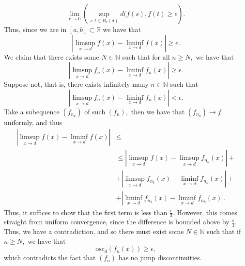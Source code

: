 \documentclass[11pt]{article}
\newcommand{\bbN}{\mathbb{N}}
\newcommand{\bbR}{\mathbb{R}}
\begin{document}
\begin{enumerate}
\begin{solution}
        \[\lim_{r\to 0}\left(\sup_{s,t\in B_r(d)}d(f(s), f(t) \geq \epsilon\right).\] Thus, since we are in $[a,b]\subset \bbR$ we have that 
        \[|\limsup_{x\to d}f(x) - \liminf_{x\to d} f(x)| \geq \epsilon.\] We claim that there exists some $N\in \bbN$ such that for all $n\geq N,$ we have that 
        \[|\limsup_{x\to d}f_n(x) - \liminf_{x\to d} f_n(x)| \geq \epsilon.\]
        Suppose not, that is, there exists infinitely many $n \in \bbN$ such that
        \[|\limsup_{x\to d}f_n(x) - \liminf_{x\to d} f_n(x)| < \epsilon.\] Take a subequence $(f_{n_k})$ of such $(f_n),$ then we have that $(f_{n_k}) \to f$ uniformly, and thus 
        \begin{align*}
            |\limsup_{x\to d}f(x) - \liminf_{x\to d} f(x)| &\leq \\
            &\leq |\limsup_{x\to d}f(x) - \limsup_{x\to d} f_{n_k}(x)| +\\ &+|\limsup_{x\to d}f_{n_k}(x) - \liminf_{x\to d} f_{n_k}(x)| +\\ &+|\liminf_{x\to d}f_{n_k}(x) - \liminf_{x\to d} f_{n_k}(x)|.
        \end{align*}
        Thus, it suffices to show that the first term is less than $\frac{\epsilon}{3}.$ However, this comes straight from uniform convergence, since the difference is bounded above by $\frac{\epsilon}{3}.$ Thus, we have a contradiction, and so there must exist some $N \in \bbN$ such that if $n\geq N,$ we have that 
        \[\text{osc}_d(f_n(x))\geq \epsilon,\] which contradicts the fact that $(f_n)$ has no jump discontinuities.
    \end{solution}
\end{enumerate}


\newpage
\end{document}
